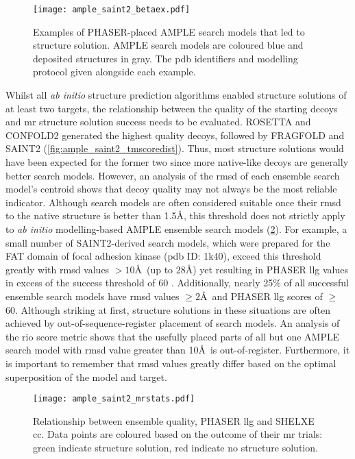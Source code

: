 \begin{figure}[H]
    \centering
    \texttt{[image: ample\_saint2\_betaex.pdf]}
    \caption[Examples of PHASER-placed AMPLE search models]{Examples of PHASER-placed AMPLE search models that led to structure solution. AMPLE search models are coloured blue and deposited structures in gray. The \gls{pdb} identifiers and modelling protocol given alongside each example.}
    \label{fig:ample_saint2_betaex}
\end{figure}

Whilst all \textit{ab initio} structure prediction algorithms enabled structure solutions of at least two targets, the relationship between the quality of the starting decoys and \gls{mr} structure solution success needs to be evaluated. ROSETTA and CONFOLD2 generated the highest quality decoys, followed by FRAGFOLD and SAINT2 (\cref{fig:ample_saint2_tmscoredist}). Thus, most structure solutions would have been expected for the former two since more native-like decoys are generally better search models. However, an analysis of the \gls{rmsd} of each ensemble search model's centroid shows that decoy quality may not always be the most reliable indicator. Although search models are often considered suitable once their \gls{rmsd} to the native structure is better than 1.5\AA \cite{Scapin2013-yp}, this threshold does not strictly apply to \textit{ab initio} modelling-based AMPLE ensemble search models (\cref{fig:ample_saint2_mrstats}). For example, a small number of SAINT2-derived search models, which were prepared for the FAT domain of focal adhesion kinase (\gls{pdb} ID: 1k40), exceed this threshold greatly with \gls{rmsd} values $>10$\AA\ (up to 28\AA) yet resulting in PHASER \gls{llg} values in excess of the success threshold of 60 \cite{Oeffner2018-ur}. Additionally, nearly 25\% of all successful ensemble search models have \gls{rmsd} values $\geq2$\AA\ and PHASER \gls{llg} scores of $\geq$60. Although striking at first, structure solutions in these situations are often achieved by out-of-sequence-register placement of search models. An analysis of the \gls{rio} score metric shows that the usefully placed parts of all but one AMPLE search model with \gls{rmsd} value greater than 10\AA\ is out-of-register. Furthermore, it is important to remember that \gls{rmsd} values greatly differ based on the optimal superposition of the model and target.

\begin{figure}[H]
    \centering
    \texttt{[image: ample\_saint2\_mrstats.pdf]}
    \caption[Relationship between ensemble metrics]{Relationship between ensemble quality, PHASER \gls{llg} and SHELXE \gls{cc}. Data points are coloured based on the outcome of their \gls{mr} trials: green indicate structure solution, red indicate no structure solution.}
    \label{fig:ample_saint2_mrstats}
\end{figure}

